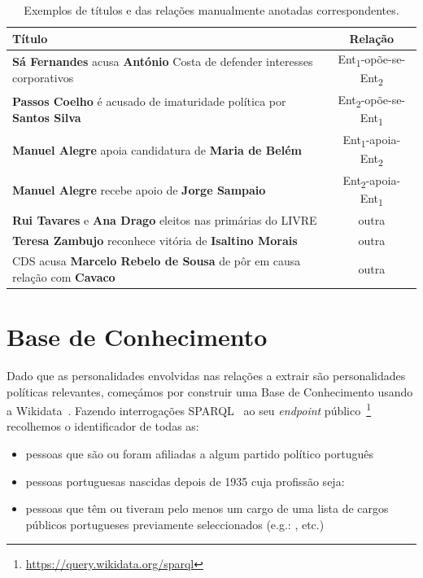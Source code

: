 \documentclass[a4paper, twocolumn, 11pt, twoside]{article}
\begin{document}
\begin{table}[!h]
  \centering
  \begin{tabular}{lc}
      {\bf Título} & {\bf Relação} \\
      \hline
	  \textbf{Sá Fernandes} acusa \textbf{António} Costa de defender interesses corporativos &	Ent\textsubscript{1}-opõe-se-Ent\textsubscript{2} \\
	  \textbf{Passos Coelho} é acusado de imaturidade política por \textbf{Santos Silva} &	Ent\textsubscript{2}-opõe-se-Ent\textsubscript{1}	\\
	  \textbf{Manuel Alegre} apoia candidatura de \textbf{Maria de Belém} &	Ent\textsubscript{1}-apoia-Ent\textsubscript{2}	\\
	  \textbf{Manuel Alegre} recebe apoio de \textbf{Jorge Sampaio} & Ent\textsubscript{2}-apoia-Ent\textsubscript{1}	\\
	  \textbf{Rui Tavares} e \textbf{Ana Drago} eleitos nas primárias do LIVRE & outra	\\
	  \textbf{Teresa Zambujo} reconhece vitória de \textbf{Isaltino Morais} & outra	\\
	  CDS acusa \textbf{Marcelo Rebelo de Sousa} de pôr em causa relação com \textbf{Cavaco} & outra \\
	  \hline
  \end{tabular}
  \caption{Exemplos de títulos e das relações manualmente anotadas correspondentes.}
  \label{tab:samples}
\end{table}


\section{Base de Conhecimento}
\label{sec_kb}
Dado que as personalidades envolvidas nas relações a extrair são personalidades políticas relevantes, começámos por construir uma Base de Conhecimento usando a Wikidata~\citep{MKGGB2018}. Fazendo interrogações SPARQL~\cite{2013sparql} ao seu \textit{endpoint} público~\footnote{\url{https://query.wikidata.org/sparql}} recolhemos o identificador de todas as:

\begin{itemize}  
\item pessoas que são ou foram afiliadas a algum partido político português
\item pessoas portuguesas nascidas depois de 1935 cuja profissão seja: 
\item pessoas que têm ou tiveram pelo menos um cargo de uma lista de cargos públicos portugueses previamente seleccionados (e.g.: , etc.)
\end{itemize}  
\end{document}
